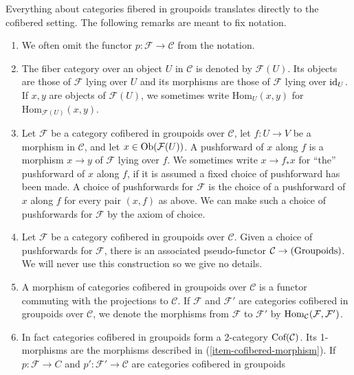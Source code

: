 \begin{remarks}
\label{remarks-cofibered-groupoids}
Everything about categories fibered in groupoids translates directly to the 
cofibered setting.  The following remarks are meant to fix notation.
\begin{enumerate}
\item We often omit the functor $p: \mathcal F \rightarrow \mathcal C$ from the 
notation.
\item The fiber category over an object $U$ in $\mathcal C$ is denoted by 
$\mathcal F(U)$. Its objects are those of $\mathcal F$ lying over $U$ and its 
morphisms are those of $\mathcal F$ lying over $\textnormal{id}_{U}$.  If $x,y$ 
are objects of $\mathcal F(U)$, we sometimes write $\text{Hom}_{U}(x,y)$ for 
$\text{Hom}_{\mathcal F(U)}(x,y)$.
\item Let $\mathcal F$ be a category cofibered in groupoids over $\mathcal C$, 
let $f: U \rightarrow V$ be a morphism in $\mathcal C$, and let $x \in 
\textnormal{Ob}(\mathcal F(U))$.  A pushforward of $x$ along $f$ is a morphism 
$x \rightarrow y$ of $\mathcal F$ lying over $f$.  We sometimes write $x 
\rightarrow f_*x$ for ``the'' pushforward of $x$ along $f$, if it is assumed a 
fixed choice of pushforward has been made.  A choice of pushforwards for 
$\mathcal F$ is the choice of a pushforward of $x$ along $f$ for every pair 
$(x,f)$ as above.  We can make such a choice of pushforwards for $\mathcal F$ 
by the axiom of choice.
\item Let $\mathcal F$ be a category cofibered in groupoids over $\mathcal C$. 
Given a choice of pushforwards for $\mathcal F$, there is an associated 
pseudo-functor $\mathcal C \rightarrow \textnormal{(Groupoids)}$.  We will 
never use this construction so we give no details.
\item
\label{item-cofibered-morphism}
A morphism of categories cofibered in groupoids over $\mathcal C$ is a functor 
commuting with the projections to $\mathcal C$.  If $\mathcal F$ and $\mathcal 
F'$ are categories cofibered in groupoids over $\mathcal C$, we denote the 
morphisms from $\mathcal F$ to $\mathcal F'$ by $\textnormal{Hom}_{\mathcal 
C}(\mathcal F, \mathcal F')$.
\item 
\label{definition-cofibered-groupoids-2-category}
In fact categories cofibered in groupoids form a 2-category 
$\textnormal{Cof}(\mathcal C)$. Its 1-morphisms are the morphisms described in 
(\ref{item-cofibered-morphism}).  If $p: \mathcal F \rightarrow C$ and 
$p': \mathcal F' \rightarrow \mathcal C$ are categories cofibered in groupoids 

\end{enumerate}
\end{remarks}

